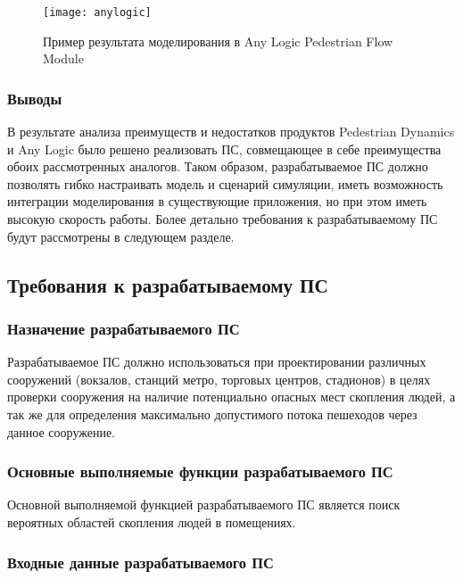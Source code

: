 \begin{figure}[ht!]
  \texttt{[image: anylogic]}
  \caption{Пример результата моделирования в Any Logic Pedestrian Flow Module}
  \label{sub:domain:analogs:anylogic:image_example}
\end{figure}

\subsubsection{Выводы}
\label{sub:domain:analogs:results}

В результате анализа преимуществ и недостатков продуктов Pedestrian Dynamics и Any Logic \textregistered было решено реализовать ПС, совмещающее в себе преимущества обоих рассмотренных аналогов.
Таком образом, разрабатываемое ПС должно позволять гибко настраивать модель и сценарий симуляции, иметь возможность интеграции моделирования в существующие приложения, но при этом иметь высокую скорость работы.
Более детально требования к разрабатываемому ПС будут рассмотрены в следующем разделе.

\subsection{Требования к разрабатываемому ПС}
\label{sub:domain:requirements}

\subsubsection{Назначение разрабатываемого ПС}
\label{sub:domain:requirements:purpose}

Разрабатываемое ПС должно использоваться при проектировании различных сооружений (вокзалов, станций метро, торговых центров, стадионов) в целях проверки сооружения на наличие потенциально опасных мест скопления людей, а так же для определения максимально допустимого потока пешеходов через данное сооружение.

\subsubsection{Основные выполняемые функции разрабатываемого ПС}
\label{sub:domain:requirements:purpose}

Основной выполняемой функцией разрабатываемого ПС является поиск вероятных областей скопления людей в помещениях.

\subsubsection{Входные данные разрабатываемого ПС}
\label{sub:domain:requirements:purpose}

